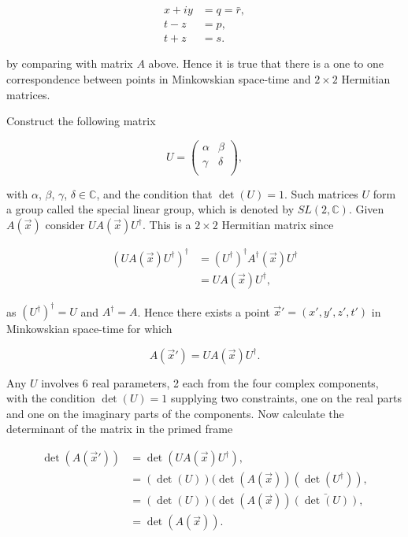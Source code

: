 \begin{align*}
x + iy & = q = \bar{r}, \\
t - z & = p, \\
t+z  & = s.
\end{align*}

\noindent by comparing with matrix $A$ above. Hence it is true that there is a one to one correspondence between points in Minkowskian space-time and $2 \times 2$ Hermitian matrices.

Construct the following matrix

\begin{equation*} 
U = \left( 
\begin{array}{cc}
\alpha & \beta \\
\gamma & \delta \\
\end{array}
\right),
\end{equation*}

\noindent with $\alpha$, $\beta$, $\gamma$, $\delta \in \mathbb{C}$, and the condition that $\det(U) = 1$. Such matrices $U$ form a group called the special linear group, which is denoted by $SL(2, \mathbb{C})$. Given $A(\vec{x})$ consider $U A(\vec{x}) U^{\dagger}$. This is a $2 \times 2$ Hermitian matrix since

\begin{align*}
(U A(\vec{x}) U^{\dagger})^{\dagger} & =  (U^{\dagger})^{\dagger} A^{\dagger}(\vec{x}) U^{\dagger} \\
                                     & = U A(\vec{x}) U^{\dagger},
\end{align*} 

\noindent as $(U^{\dagger})^{\dagger} = U$ and $A^{\dagger} = A$. Hence there exists a point $\vec{x}' = (x', y', z', t')$ in Minkowskian space-time for which

\begin{equation}\label{SL_trans}
A(\vec{x}') = U A(\vec{x}) U^{\dagger}.
\end{equation}

Any $U$ involves 6 real parameters, 2 each from the four complex components, with the condition $\det(U) = 1$ supplying two constraints, one on the real parts and one on the imaginary parts of the components. Now calculate the determinant of the matrix in the primed frame

\begin{align*}  
\det(A(\vec{x}')) & = \det(U A(\vec{x}) U^{\dagger}), \\
                  & = (\det(U))(\det(A(\vec{x}))(\det(U^{\dagger})), \\
                  & = (\det(U))(\det(A(\vec{x}))\bar{(\det(U))}, \\
                  & = \det(A(\vec{x})).
\end{align*}

